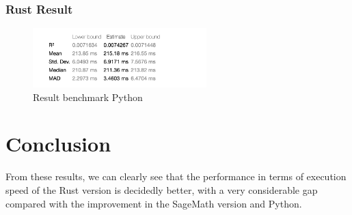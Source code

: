 \subsubsection*{Rust Result}
\begin{figure}[!h]
    \centering
    \includegraphics[width=0.60\textwidth]{images/benchmark/too_large_graph/benchmark_too_large_graph_rust}
    \caption{Result benchmark Python}
    \label{fig:benchmark-too-large-graph-rust}
\end{figure}


\section{Conclusion}\label{sec:conclusion}

From these results, we can clearly see that the performance in terms of execution speed of the Rust version is decidedly better, with a very considerable gap compared with the improvement in the SageMath version and Python.


